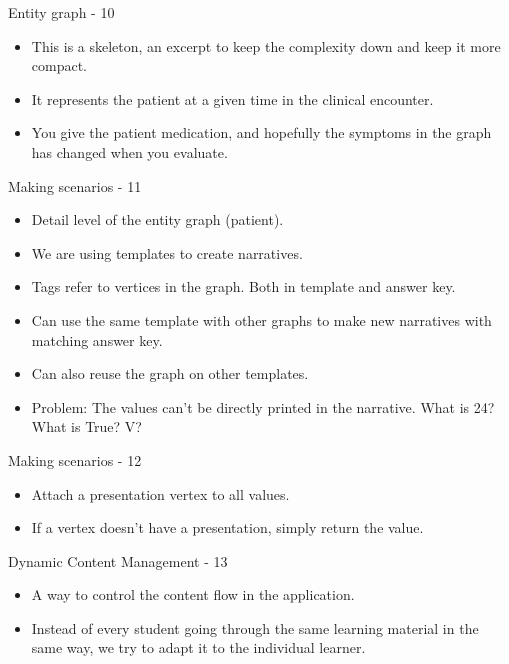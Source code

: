 \documentclass{beamer}
\begin{document}
\begin{frame}{Entity graph - 10}
\begin{itemize}
	\item This is a skeleton, an excerpt to keep the complexity down and keep it more compact.
	\item It represents the patient at a given time in the clinical encounter.
	\item You give the patient medication, and hopefully the symptoms in the graph has changed when you evaluate.
\end{itemize}
\end{frame}

\begin{frame}{Making scenarios - 11}
\begin{itemize}
	\item Detail level of the entity graph (patient).
	\item We are using templates to create narratives.
	\item Tags refer to vertices in the graph. Both in template and answer key.
	\item Can use the same template with other graphs to make new narratives with matching answer key.
	\item Can also reuse the graph on other templates.
	\item Problem: The values can't be directly printed in the narrative. What is 24? What is True? V?
\end{itemize}
\end{frame}

\begin{frame}{Making scenarios - 12}
\begin{itemize}
\item Attach a presentation vertex to all values.
\item If a vertex doesn't have a presentation, simply return the value.
\end{itemize}
\end{frame}

\begin{frame}{Dynamic Content Management - 13}
\begin{itemize}
	\item A way to control the content flow in the application.
	\item Instead of every student going through the same learning material in the same way, we try to adapt it to the individual learner.
\end{itemize}
\end{frame}
\end{document}

